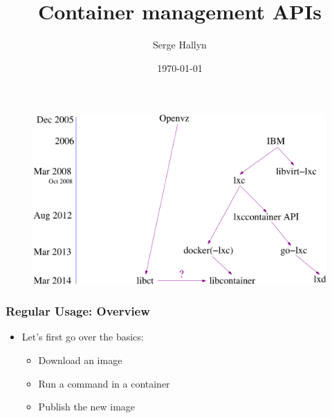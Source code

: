 \documentclass{beamer}
\title[Linux Container APIs]{Container management APIs} %
\author{Serge Hallyn} %
\institute[Canonical] %
{
Canonical, Ltd \\ %
\medskip
\textit{serge.hallyn@ubuntu.com} %
}
\date{\today} %
\begin{document}
\lstset{language=sh}

\begin{frame}
\titlepage %
\end{frame}

\begin{frame}
\begin{figure}
  \includegraphics[width=\textwidth]{timeline.pdf}
\end{figure}
\end{frame}

\begin{frame}
\frametitle{Regular Usage: Overview}
\begin{itemize}
\item Let's first go over the basics:
  \begin{itemize}
  \item Download an image
  \item Run a command in a container
  \item Publish the new image
  \end{itemize}
\end{itemize}
\end{frame}
\end{document}
